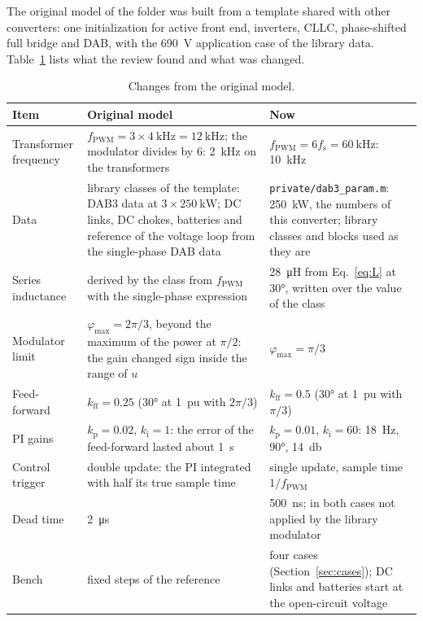 \documentclass[12pt,a4paper]{scrartcl}
\newcommand{\ped}[1]{_{\mathrm{#1}}}
\newcommand{\code}[1]{\texttt{#1}}
\begin{document}
\begin{onehalfspace}
The original model of the folder was built from a template shared with other converters: one initialization for active front end, inverters, CLLC, phase-shifted full bridge and DAB, with the \SI{690}{\volt} application case of the library data. Table~\ref{tab:changes} lists what the review found and what was changed.

\begin{table}[H]
	\centering
	\captionsetup{width=0.9\textwidth, font=small}
	\caption{Changes from the original model.}
	\label{tab:changes}
	\small
	\begin{tabularx}{0.97\textwidth}{@{} >{\raggedright\arraybackslash}p{} X X @{}}
		\toprule
		\textbf{Item} & \textbf{Original model} & \textbf{Now} \\
		\midrule
		Transformer frequency & $f\ped{PWM} = 3 \times \SI{4}{\kilo\hertz} = \SI{12}{\kilo\hertz}$; the modulator divides by 6: \SI{2}{\kilo\hertz} on the transformers & $f\ped{PWM} = 6 f\ped{s} = \SI{60}{\kilo\hertz}$: \SI{10}{\kilo\hertz} \\
		Data & library classes of the template: DAB3 data at $3 \times \SI{250}{\kilo\watt}$; DC links, DC chokes, batteries and reference of the voltage loop from the single-phase DAB data & \code{private/dab3\_param.m}: \SI{250}{\kilo\watt}, the numbers of this converter; library classes and blocks used as they are \\
		Series inductance & derived by the class from $f\ped{PWM}$ with the single-phase expression & \SI{28}{\micro\henry} from Eq.~\eqref{eq:L} at \ang{30}, written over the value of the class \\
		Modulator limit & $\varphi\ped{max} = 2\pi/3$, beyond the maximum of the power at $\pi/2$: the gain changed sign inside the range of $u$ & $\varphi\ped{max} = \pi/3$ \\
		Feed-forward & $k\ped{ff} = 0.25$ (\ang{30} at \SI{1}{pu} with $2\pi/3$) & $k\ped{ff} = 0.5$ (\ang{30} at \SI{1}{pu} with $\pi/3$) \\
		PI gains & $k\ped{p} = 0.02$, $k\ped{i} = 1$: the error of the feed-forward lasted about \SI{1}{\second} & $k\ped{p} = 0.01$, $k\ped{i} = 60$: \SI{18}{\hertz}, \ang{90}, \SI{14}{\decibel} \\
		Control trigger & double update: the PI integrated with half its true sample time & single update, sample time $1/f\ped{PWM}$ \\
		Dead time & \SI{2}{\micro\second} & \SI{500}{\nano\second}; in both cases not applied by the library modulator \\
		Bench & fixed steps of the reference & four cases (Section~\ref{sec:cases}); DC links and batteries start at the open-circuit voltage \\
		\bottomrule
	\end{tabularx}
\end{table}


\end{onehalfspace}
\end{document}
